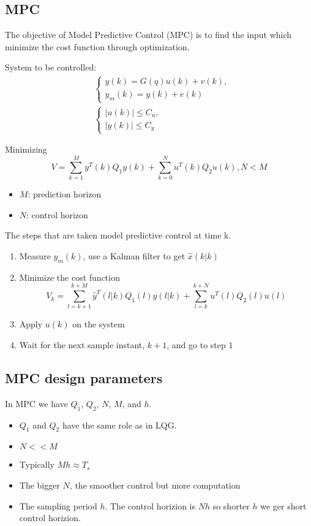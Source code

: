 \begin{multicols}{2}
\section{MPC}
The objective of Model Predictive Control (MPC) is to 
find the input which minimize the cost function through 
optimization.

System to be controlled:
\begin{align*}
    &\begin{cases}
    y(k) = G(q)u(k) + v(k), \\
    y_m(k) = y(k) + e(k)
    \end{cases}  \\
    &\begin{cases}
    |u(k)| \leq C_u, \\
    |y(k)| \leq C_y
    \end{cases}
\end{align*}

Minimizing
\begin{equation*}
    V = \sum^M_{k=1}y^T(k)Q_1y(k) + \sum^N_{k=0}u^T(k)Q_2u(k), N<M
\end{equation*}

\begin{itemize}
    \item $M$: prediction horizon
    \item $N$: control horizon
\end{itemize}

The steps that are taken model predictive control at time k.
\begin{enumerate}
    \item Measure $y_m(k)$, use a Kalman filter to get $\hat{x}(k|k)$
    \item Minimize the cost function 
    \begin{equation*}
    V_k = \sum^{k+M}_{l=k+1}\hat{y}^T(l|k)Q_1(l)y(l|k) + \sum^{k+N}_{l=k}u^T(l)Q_2(l)u(l)
    \end{equation*}
    \item Apply $u(k)$ on the system
    \item Wait for the next sample instant, $k+1$, and go to step $1$
\end{enumerate}


\subsection{MPC design parameters}
In MPC we have $Q_1$, $Q_2$, $N$, $M$, and $h$.
\begin{itemize}
    \item $Q_1$ and $Q_2$ have the same role as in LQG.
    \item $N<<M$
    \item Typically $Mh \approx T_s$
    \item The bigger $N$, the smoother control but more computation
    \item The sampling period $h$. The control horizion is $Nh$ so shorter $h$ we ger short control horizion.
\end{itemize}

\end{multicols}
